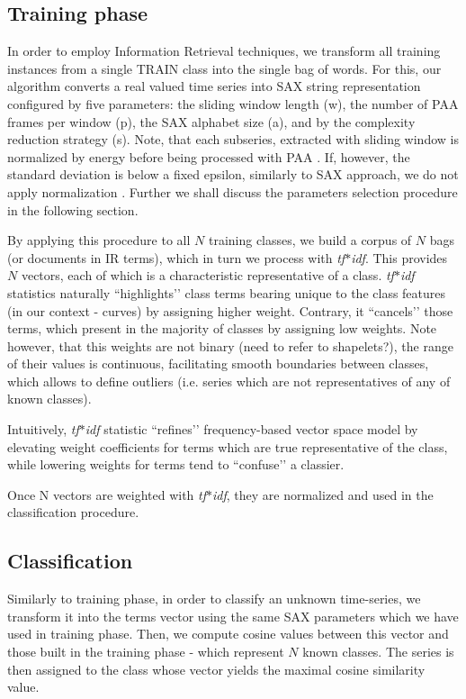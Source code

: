 \documentclass{llncs}
\begin{document}
\subsection{Training phase}
In order to employ Information Retrieval techniques, we transform all training instances from a
single TRAIN class into the single bag of words. For this, our algorithm converts a real valued time
series into SAX string representation configured by five parameters: the sliding window length (w),
the number of PAA frames per window (p), the SAX alphabet size (a), and by the complexity reduction
strategy (s). Note, that each subseries, extracted with sliding window is normalized by energy
before being processed with PAA \cite{goldin_kanellakis}. If, however, the standard deviation is
below a fixed epsilon, similarly to SAX approach, we do not apply normalization
\cite{sax}. Further we shall discuss the parameters selection procedure in the following section.

By applying this procedure to all $N$ training classes, we build a corpus of $N$ bags (or documents in
IR terms), which in turn we process with \textit{tf$\ast$idf}. This provides $N$ vectors, each of
which is a characteristic representative of a class. \textit{tf$\ast$idf} statistics naturally
``highlights’’ class terms bearing unique to the class features (in our context - curves) by
assigning higher weight. Contrary, it ``cancels’’ those terms, which present in the majority of
classes by assigning low weights. Note however, that this weights are not binary (need to refer to
shapelets?), the range of their values is continuous, facilitating smooth boundaries between
classes, which allows to define outliers (i.e. series which are not representatives of any of known
classes).

Intuitively, \textit{tf$\ast$idf} statistic ``refines’’ frequency-based vector space model by
elevating weight coefficients for terms which are true representative of the class, while lowering
weights for terms tend to ``confuse’’ a classier.

Once N vectors are weighted with \textit{tf$\ast$idf}, they are normalized and used in the
classification procedure.

\subsection{Classification}
Similarly to training phase, in order to classify an unknown time-series, we transform it into the
terms vector using the same SAX parameters which we have used in training phase. Then, we compute
cosine values between this vector and those built in the training phase - which represent $N$ known
classes. The series is then assigned to the class whose vector yields the maximal cosine similarity
value.
\end{document}
